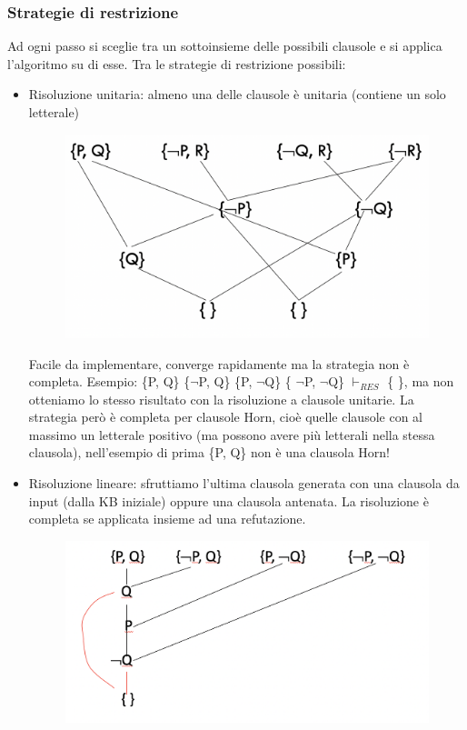 \documentclass{article}
\begin{document}
\subsubsection{Strategie di restrizione}
Ad ogni passo si sceglie tra un sottoinsieme delle possibili clausole e si applica l'algoritmo su di esse. Tra le strategie di restrizione possibili:
\begin{itemize}
    \item Risoluzione unitaria: almeno una delle clausole è unitaria (contiene un solo letterale)
        \begin{figure}[H]
        \centering
        \includegraphics[scale=0.4]{Images/risoluzioneunitaria.png}
        \end{figure}
        Facile da implementare, converge rapidamente ma la strategia non è completa. \newline 
        Esempio: \{P, Q\} \{$\neg$P, Q\} \{P, $\neg$Q\} \{ $\neg$P, $\neg$Q\} $\vdash _{RES}$ \{ \}, ma non otteniamo lo stesso risultato con la risoluzione a clausole unitarie. \newline
        La strategia però è completa per clausole Horn, cioè quelle clausole con al massimo un letterale positivo (ma possono avere più letterali nella stessa clausola), nell'esempio di prima \{P, Q\} non è una clausola Horn! \clearpage
    \item Risoluzione lineare: sfruttiamo l'ultima clausola generata con una clausola da input (dalla KB iniziale) oppure una clausola antenata. La risoluzione è completa se applicata insieme ad una refutazione.
        \begin{figure}[H]
        \centering
        \includegraphics[scale=0.4]{Images/risoluzionelineare.png}

\end{figure}
\end{itemize}
\end{document}
